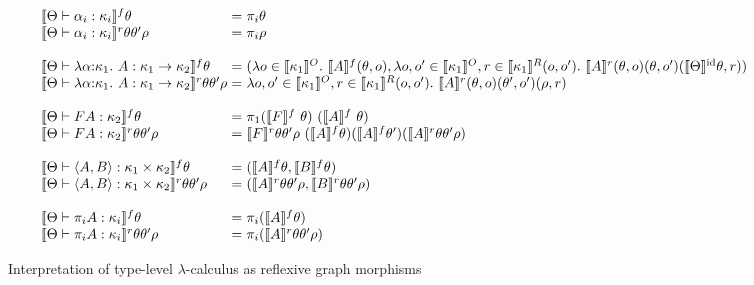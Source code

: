 \documentclass[preprint]{sigplanconf}
\theoremstyle{examplestyle}
\newcommand{\sem}[1]{\llbracket #1 \rrbracket}
\newcommand{\semKU}[1]{\llbracket #1 \rrbracket^O}
\newcommand{\semKR}[1]{\llbracket #1 \rrbracket^R}
\newcommand{\semKI}[1]{\llbracket #1 \rrbracket^{\mathrm{id}}}
\begin{document}
\begin{figure*}[t]
  \begin{displaymath}
    \begin{array}{l@{\hspace{0.3em}}c@{\hspace{0.3em}}l}
      \sem{\Theta \vdash \alpha_i : \kappa_i}^f \theta & = & \pi_i \theta \\
      \sem{\Theta \vdash \alpha_i : \kappa_i}^r\theta\theta' \rho & = & \pi_i \rho \\
      \\
      \sem{\Theta \vdash \lambda \alpha \mathord: \kappa_1.~A : \kappa_1 \to \kappa_2}^f \theta & = & (
      \begin{array}[t]{@{}l}
        \lambda o \in \semKU{\kappa_1}.\ \sem{A}^f(\theta, o), 
        \lambda o, o' \in \semKU{\kappa_1}, r \in \semKR{\kappa_1}(o,o').\ \sem{A}^r(\theta,o)(\theta,o')(\semKI{\Theta}\theta, r))
      \end{array}\\
      \sem{\Theta \vdash \lambda \alpha \mathord: \kappa_1.~A : \kappa_1 \to \kappa_2}^r \theta\theta' \rho & = &
      \lambda o,o' \in \semKU{\kappa_1}, r \in \semKR{\kappa_1}(o,o').\ \sem{A}^r(\theta,o)(\theta',o')(\rho, r) \\
      \\
      \sem{\Theta \vdash F A : \kappa_2}^f \theta & = & \pi_1 (\sem{F}^f\ \theta)\ (\sem{A}^f\ \theta)\\
      \sem{\Theta \vdash F A : \kappa_2}^r\theta\theta'\rho & = & \sem{F}^r\theta\theta'\rho\ (\sem{A}^f \theta)(\sem{A}^f \theta')(\sem{A}^r\theta\theta'\rho) \\
      \\
      \sem{\Theta \vdash \langle A, B \rangle : \kappa_1 \times \kappa_2}^f \theta & = & (\sem{A}^f \theta, \sem{B}^f \theta) \\
      \sem{\Theta \vdash \langle A, B \rangle : \kappa_1 \times \kappa_2}^r \theta \theta' \rho & = & (\sem{A}^r \theta \theta' \rho, \sem{B}^r \theta \theta' \rho) \\
      \\
      \sem{\Theta \vdash \pi_i A : \kappa_i}^f \theta & = & \pi_i (\sem{A}^f \theta) \\
      \sem{\Theta \vdash \pi_i A : \kappa_i}^r \theta \theta' \rho & = & \pi_i (\sem{A}^r \theta \theta' \rho)
    \end{array}
  \end{displaymath}
  \caption{Interpretation of type-level $\lambda$-calculus as reflexive graph morphisms}
  \label{fig:type-level-lambda-calc}
\end{figure*}
\end{document}
